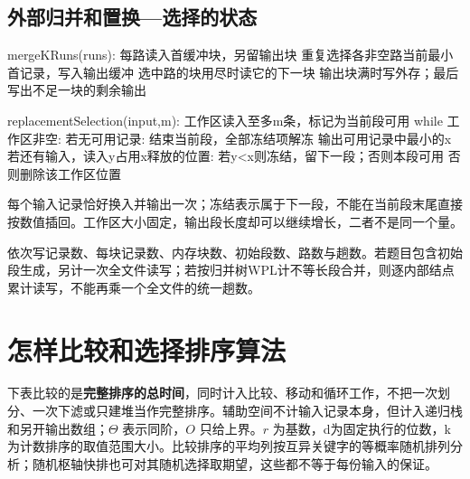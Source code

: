 \subsection{外部归并和置换---选择的状态}\label{DS08-external-code}

\par\medskip\noindent\begin{minipage}{\linewidth}
\begin{codeblock}[language={}]
mergeKRuns(runs):
    每路读入首缓冲块，另留输出块
    重复选择各非空路当前最小首记录，写入输出缓冲
    选中路的块用尽时读它的下一块
    输出块满时写外存；最后写出不足一块的剩余输出
\end{codeblock}
\end{minipage}\par\medskip

\par\medskip\noindent\begin{minipage}{\linewidth}
\begin{codeblock}[language={}]
replacementSelection(input,m):
    工作区读入至多m条，标记为当前段可用
    while 工作区非空:
        若无可用记录: 结束当前段，全部冻结项解冻
        输出可用记录中最小的x
        若还有输入，读入y占用x释放的位置:
            若y<x则冻结，留下一段；否则本段可用
        否则删除该工作区位置
\end{codeblock}
\end{minipage}\par\medskip

每个输入记录恰好换入并输出一次；冻结表示属于下一段，不能在当前段末尾直接按数值插回。工作区大小固定，输出段长度却可以继续增长，二者不是同一个量。

\begin{methodbox}[外部排序先统一单位再计I/O]

依次写记录数、每块记录数、内存块数、初始段数、路数与趟数。若题目包含初始段生成，另计一次全文件读写；若按归并树WPL计不等长段合并，则逐内部结点累计读写，不能再乘一个全文件的统一趟数。

\end{methodbox}

\section{怎样比较和选择排序算法}\label{DS08-11}

下表比较的是\textbf{完整排序的总时间}，同时计入比较、移动和循环工作，不把一次划分、一次下滤或只建堆当作完整排序。辅助空间不计输入记录本身，但计入递归栈和另开输出数组；\(\Theta\) 表示同阶，\(O\) 只给上界。\(r\) 为基数，d为固定执行的位数，k为计数排序的取值范围大小。比较排序的平均列按互异关键字的等概率随机排列分析；随机枢轴快排也可对其随机选择取期望，这些都不等于每份输入的保证。

